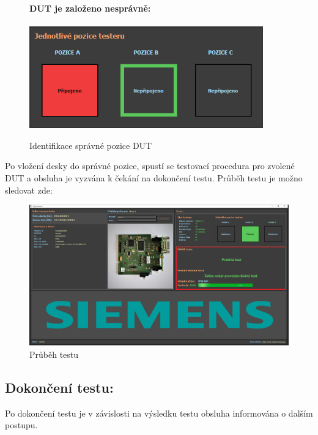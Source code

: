 \begin{figure}[ht!]
\begin{minipage}{0.32\textwidth}
	\end{minipage}
    \hfill
	\begin{minipage}{0.32\textwidth}
		\textbf{DUT je založeno nesprávně:}\\\\
		\includegraphics[width = 0.9\textwidth]{obrazky/BAD_BOARD.PNG}
		
	\end{minipage}
    \caption{Identifikace správné pozice DUT}
\end{figure}

Po vložení desky do správné pozice, spustí se testovací procedura pro zvolené DUT
a obsluha je vyzvána k čekání na dokončení testu.
Průběh testu je možno sledovat zde:
\begin{figure}[ht!]
	\centering
	\includegraphics[width = 1\textwidth]{obrazky/TEST_START_EDITED.PNG}
    \caption{Průběh testu}
\end{figure}

\clearpage
\subsection{Dokončení testu:}
Po dokončení testu je v závislosti na výsledku testu obsluha informována o dalším postupu.

